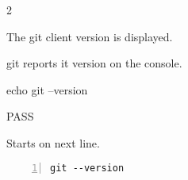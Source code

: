 \begin{description}[align=right,leftmargin=3.2cm,labelindent=3.0cm]
\item[Step:] 2
\item[Confirm:] The git client version is displayed.
\item[Expectation:] git reports it version on the console.
\item[Command:] echo git  --version
\item[Test Result:] PASS
\item[Evidence:] Starts on next line.
\end{description}
\begin{lstlisting}[numbers=left]
git --version

\end{lstlisting}
